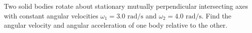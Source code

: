 
\item Two solid bodies rotate about stationary mutually perpendicular intersecting axes with constant angular velocities \(\omega_1 = 3.0 \text{ rad/s}\) and \(\omega_2 = 4.0 \text{ rad/s}\). Find the angular velocity and angular acceleration of one body relative to the other.
